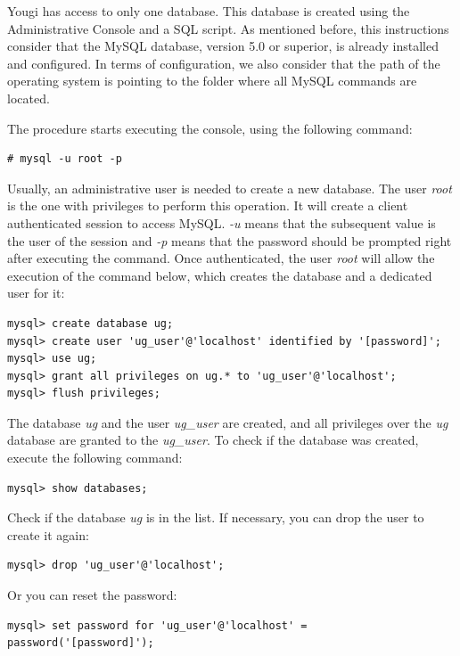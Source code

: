 \documentclass[envcountsame,envcountchap]{svmono}
\begin{document}
Yougi has access to only one database. This database is created using the Administrative Console and a SQL script. As mentioned before, this instructions consider that the MySQL database, version 5.0 or superior, is already installed and configured. In terms of configuration, we also consider that the path of the operating system is pointing to the folder where all MySQL commands are located.

The procedure starts executing the console, using the following command:

\begin{verbatim}
# mysql -u root -p
\end{verbatim}

Usually, an administrative user is needed to create a new database. The user \textit{root} is the one with privileges to perform this operation. It will create a client authenticated session to access MySQL. \textit{-u} means that the subsequent value is the user of the session and \textit{-p} means that the password should be prompted right after executing the command. Once authenticated, the user \textit{root} will allow the execution of the command below, which creates the database and a dedicated user for it:

\begin{verbatim}
mysql> create database ug;
mysql> create user 'ug_user'@'localhost' identified by '[password]';
mysql> use ug;
mysql> grant all privileges on ug.* to 'ug_user'@'localhost';
mysql> flush privileges;
\end{verbatim}

The database \textit{ug} and the user \textit{ug\_user} are created, and all privileges over the \textit{ug} database are granted to the \textit{ug\_user}. To check if the database was created, execute the following command:

\begin{verbatim}
mysql> show databases;
\end{verbatim}

Check if the database \textit{ug} is in the list. If necessary, you can drop the user to create it again:

\begin{verbatim}
mysql> drop 'ug_user'@'localhost';
\end{verbatim}

Or you can reset the password:

\begin{verbatim}
mysql> set password for 'ug_user'@'localhost' = password('[password]');
\end{verbatim}
\end{document}
